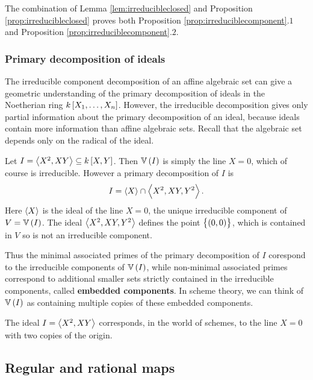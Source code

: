 The combination of Lemma \ref{lem:irreducibleclosed} and Proposition \ref{prop:irreducibleclosed} proves both Proposition \ref{prop:irreduciblecomponent}.$ 1 $ and Proposition \ref{prop:irreduciblecomponent}.$ 2 $.

\pagebreak

\subsubsection{Primary decomposition of ideals}

The irreducible component decomposition of an affine algebraic set can give a geometric understanding of the primary decomposition of ideals in the Noetherian ring $ k\sbr{X_1, \dots, X_n} $. However, the irreducible decomposition gives only partial information about the primary decomposition of an ideal, because ideals contain more information than affine algebraic sets. Recall that the algebraic set depends only on the radical of the ideal.

\begin{example*}
Let $ I = \abr{X^2, XY} \subseteq k\sbr{X, Y} $. Then $ \VV\br{I} $ is simply the line $ X = 0 $, which of course is irreducible. However a primary decomposition of $ I $ is
$$ I = \left\langle X \right\rangle \cap \left\langle X^2, XY, Y^2 \right\rangle. $$
Here $ \left\langle X \right\rangle $ is the ideal of the line $ X = 0 $, the unique irreducible component of $ V = \VV\br{I} $. The ideal $ \left\langle X^2, XY, Y^2 \right\rangle $ defines the point $ \cbr{\br{0, 0}} $, which is contained in $ V $ so is not an irreducible component.
\end{example*}

Thus the minimal associated primes of the primary decomposition of $ I $ corespond to the irreducible components of $ \VV\br{I} $, while non-minimal associated primes correspond to additional smaller sets strictly contained in the irreducible components, called \textbf{embedded components}. In scheme theory, we can think of $ \VV\br{I} $ as containing multiple copies of these embedded components.

\begin{example*}
The ideal $ I = \left\langle X^2, XY \right\rangle $ corresponds, in the world of schemes, to the line $ X = 0 $ with two copies of the origin.
\end{example*}

\subsection{Regular and rational maps}

